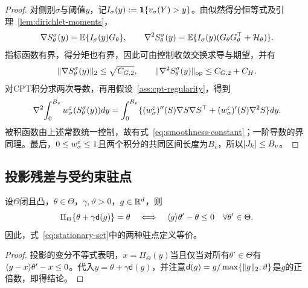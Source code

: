 \begin{proof}
对侧别$\sigma$与阈值$y$，记$I_\sigma(y):=\mathbf 1\{v_\sigma(Y)>y\}$。由似然得分恒等式及引理~\ref{lem:dirichlet-moments}，
\[
 \nabla S_\theta^\sigma(y)=\mathbb E\{I_\sigma(y)G_\theta\},
 \qquad
 \nabla^2S_\theta^\sigma(y)
 =\mathbb E\{I_\sigma(y)(G_\theta G_\theta^\top+\mathcal H_\theta)\}.
\]
指标函数有界，得分矩也有界，因此可由控制收敛交换求导与期望，并有
\[
 \lVert\nabla S_\theta^\sigma(y)\rVert_2\le\sqrt{C_{G,2}},
 \qquad
 \lVert\nabla^2S_\theta^\sigma(y)\rVert_{\mathrm{op}}\le C_{G,2}+C_H.
\]
对CPT积分求两次导数，再用假设~\ref{ass:cpt-regularity}，得到
\[
 \nabla^2\!\int_0^{B_v}w_\sigma^\varepsilon(S_\theta^\sigma(y))dy
 =\int_0^{B_v}
 \{(w_\sigma^\varepsilon)''(S)\nabla S\nabla S^\top
 +(w_\sigma^\varepsilon)'(S)\nabla^2S\}dy.
\]
被积函数由上述常数统一控制，故有式~\eqref{eq:smoothness-constant}；一阶导数的界同理。最后，$0\le w_\sigma^\varepsilon\le1$且两个积分的共同区间长度为$B_v$，所以$\lvert J_k\rvert\le B_v$。
\end{proof}

\subsection{投影残差与受约束驻点}

\begin{lemma}[投影残差刻画一阶驻点]\label{lem:residual-stationarity}
设$\Theta$闭且凸，$\theta\in\Theta$，$\gamma,\vartheta>0$，$g\in\mathbb R^d$，则
\begin{equation}\label{eq:projection-stationarity-equivalence}
 \Pi_\Theta\{\theta+\gamma\mathsf d(g)\}=\theta
 \quad\Longleftrightarrow\quad
 \langle g\rangle{\theta'-\theta}\le0\quad\forall \theta'\in\Theta.
\end{equation}
因此，式~\eqref{eq:stationary-set}中的两种驻点定义等价。
\end{lemma}

\begin{proof}
投影的变分不等式表明，$x=\Pi_\Theta(y)$当且仅当对所有$\theta'\in\Theta$有$\langle y-x\rangle{\theta'-x}\le0$。代入$y=\theta+\gamma\mathsf d(g)$，并注意$\mathsf d(g)=g/\max\{\lVert g\rVert_2,\vartheta\}$是$g$的正倍数，即得结论。
\end{proof}
